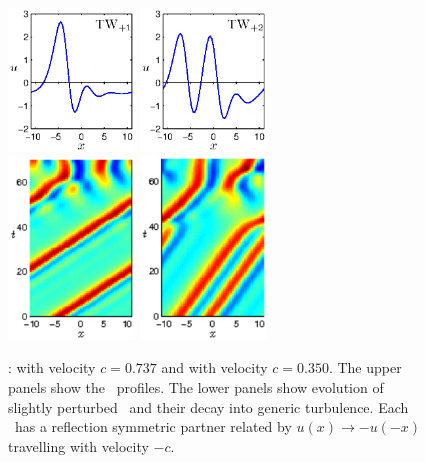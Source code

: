 \begin{figure}[t]
\begin{center}
\includegraphics[width=0.3\textwidth, clip=true]{figs_bmp/ks22_TW1_profile.eps}
\includegraphics[width=0.3\textwidth, clip=true]{figs_bmp/ks22_TW2_profile.eps}\\
\includegraphics[width=0.3\textwidth, clip=true]{figs_bmp/ks22_TW1_orbit_c.eps}
\includegraphics[width=0.3\textwidth, clip=true]{figs_bmp/ks22_TW2_orbit_c.eps}
\end{center}
\caption{
\Reqva :  with velocity $c = 0.737$ and  with
velocity $c = 0.350$.
The upper panels show the \reqva\ profiles.  The lower panels show
evolution of slightly perturbed \reqva\ and their decay into generic
turbulence. Each \reqv\ has a reflection symmetric partner related by
$u(x) \to -u(-x)$ travelling with velocity $-c$.
} \label{f:ks22TW}
\end{figure}

